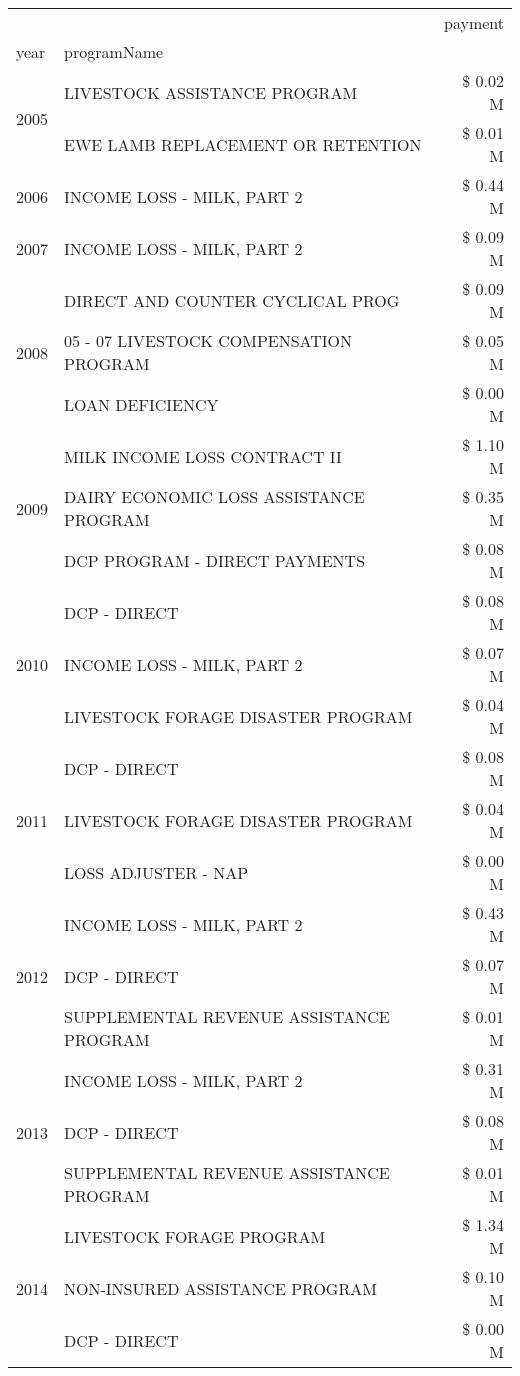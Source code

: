 \begin{tabular}{llr}
\toprule
 &  & payment \\
year & programName &  \\
\midrule
\multirow[t]{2}{*}{2005} & LIVESTOCK ASSISTANCE PROGRAM & \$ 0.02 M \\
 & EWE LAMB REPLACEMENT OR RETENTION & \$ 0.01 M \\
\cline{1-3}
2006 & INCOME LOSS - MILK, PART 2 & \$ 0.44 M \\
\cline{1-3}
2007 & INCOME LOSS - MILK, PART 2 & \$ 0.09 M \\
\cline{1-3}
\multirow[t]{3}{*}{2008} & DIRECT AND COUNTER CYCLICAL PROG & \$ 0.09 M \\
 & 05 - 07 LIVESTOCK COMPENSATION PROGRAM & \$ 0.05 M \\
 & LOAN DEFICIENCY & \$ 0.00 M \\
\cline{1-3}
\multirow[t]{3}{*}{2009} & MILK INCOME LOSS CONTRACT II & \$ 1.10 M \\
 & DAIRY ECONOMIC LOSS ASSISTANCE PROGRAM & \$ 0.35 M \\
 & DCP PROGRAM - DIRECT PAYMENTS & \$ 0.08 M \\
\cline{1-3}
\multirow[t]{3}{*}{2010} & DCP - DIRECT & \$ 0.08 M \\
 & INCOME LOSS - MILK, PART 2 & \$ 0.07 M \\
 & LIVESTOCK FORAGE DISASTER PROGRAM & \$ 0.04 M \\
\cline{1-3}
\multirow[t]{3}{*}{2011} & DCP - DIRECT & \$ 0.08 M \\
 & LIVESTOCK FORAGE DISASTER PROGRAM & \$ 0.04 M \\
 & LOSS ADJUSTER - NAP & \$ 0.00 M \\
\cline{1-3}
\multirow[t]{3}{*}{2012} & INCOME LOSS - MILK, PART 2 & \$ 0.43 M \\
 & DCP - DIRECT & \$ 0.07 M \\
 & SUPPLEMENTAL REVENUE ASSISTANCE PROGRAM & \$ 0.01 M \\
\cline{1-3}
\multirow[t]{3}{*}{2013} & INCOME LOSS - MILK, PART 2 & \$ 0.31 M \\
 & DCP - DIRECT & \$ 0.08 M \\
 & SUPPLEMENTAL REVENUE ASSISTANCE PROGRAM & \$ 0.01 M \\
\cline{1-3}
\multirow[t]{3}{*}{2014} & LIVESTOCK FORAGE PROGRAM & \$ 1.34 M \\
 & NON-INSURED ASSISTANCE PROGRAM & \$ 0.10 M \\
 & DCP - DIRECT & \$ 0.00 M \\

\end{tabular}
